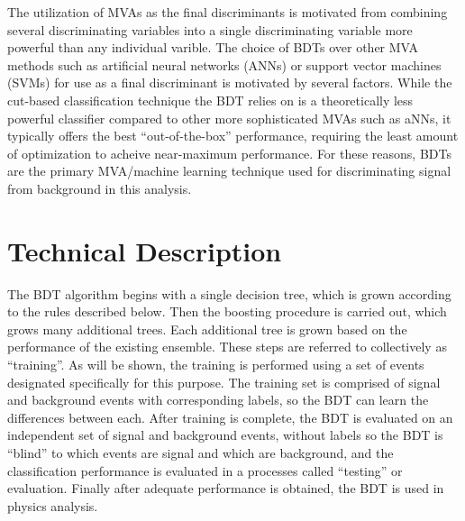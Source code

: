 The utilization of MVAs as the final discriminants is motivated from combining several discriminating variables into a single discriminating variable more powerful
than any individual varible.
The choice of BDTs over other MVA methods such as artificial neural networks (ANNs) or support vector machines (SVMs) for use as a final discriminant 
is motivated by several factors. While the cut-based classification technique the BDT relies on is a theoretically less powerful classifier compared
to other more sophisticated MVAs such as aNNs, it typically offers the best ``out-of-the-box'' performance, requiring the least amount
of optimization to acheive near-maximum performance.
For these reasons, BDTs are the primary MVA/machine learning technique used for discriminating signal from background
in this analysis.

\section{Technical Description}
The BDT algorithm begins with a single decision tree, which is grown according to the rules described below. Then the boosting procedure is carried out, which
grows many additional trees. Each additional tree is grown based on the performance of the existing ensemble. These steps are
referred to collectively as ``training''. As will be shown, the training is performed using a set of events designated specifically for this purpose.
The training set is comprised of signal and background events with corresponding labels, so the BDT can learn the differences between each.
After training is complete, the BDT is evaluated on an independent set of signal and background events, without labels so the BDT is ``blind'' to which events are
signal and which are background, and the classification performance is evaluated in a processes called ``testing'' or evaluation. Finally after adequate performance
is obtained, the BDT is used in physics analysis.

